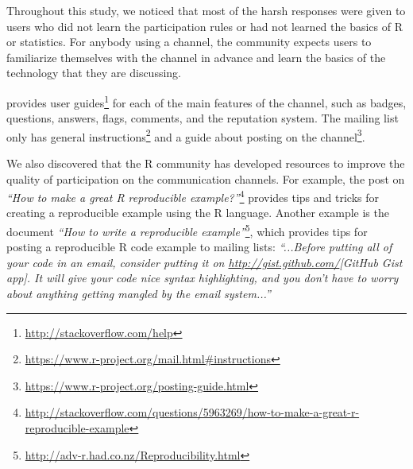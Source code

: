 


\subsubsection{\recb}

    Throughout this study, we noticed that most of the harsh responses were given to users who did not learn the participation rules or had not learned the basics of R or statistics.
    For anybody using a channel, the community expects users to familiarize themselves with the channel in advance and learn the basics of the technology that they are discussing.


    \SO provides user guides\footnote{\url{http://stackoverflow.com/help}} for each of the main features of the channel, such as badges, questions,
    answers, flags, comments, and the reputation system. The \RH mailing list only has general instructions\footnote{\url{https://www.r-project.org/mail.html\#instructions}} and a guide about posting on the channel\footnote{\url{https://www.r-project.org/posting-guide.html}}.

We also discovered that the R community has developed resources to improve the quality of participation on the communication channels.
    For example, the post on \SO \textit{``How to make a great R reproducible example?''}\footnote{\href{http://stackoverflow.com/questions/5963269/how-to-make-a-great-r-reproducible-example}{http://stackoverflow.com/questions/5963269/how-to-make-a-great-r-reproducible-example}} provides tips and tricks for creating a reproducible example using the R language.
    Another example is the document \textit{``How to write a reproducible
      example''}\footnote{\url{http://adv-r.had.co.nz/Reproducibility.html}}, which provides tips for posting a reproducible R code example to mailing lists: \textit{``...Before putting all of your code in an email, consider putting it on \url{http://gist.github.com/}{[GitHub Gist app]}. It will give your code nice syntax highlighting, and you don't have to worry about anything getting mangled by the email system...''}

